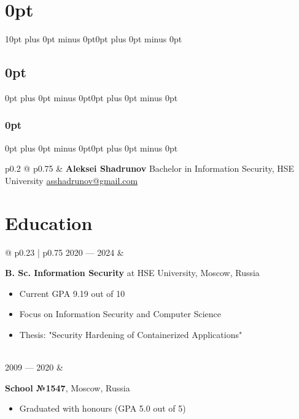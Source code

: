 \documentclass[12pt, a4paper]{extarticle}
\begin{document}
\titlespacing\section{0pt}{10pt plus 0pt minus 0pt}{0pt plus 0pt minus 0pt}
\titlespacing\subsection{0pt}{0pt plus 0pt minus 0pt}{0pt plus 0pt minus 0pt}
\titlespacing\subsubsection{0pt}{0pt plus 0pt minus 0pt}{0pt plus 0pt minus 0pt}

\begin{tabular}{ p{0.2\textwidth} @{\textwidth} p{0.75\textwidth} }
    &
    {\huge \bf \raggedleft Aleksei Shadrunov}  \newline
    \small
    {Bachelor in Information Security, HSE University} \newline
    \href{mailto:asshadrunov@gmail.com}{asshadrunov@gmail.com} \\
\end{tabular}

\section*{Education}

\begin{tabular}{ @{\hskip 0pt} p{0.23\textwidth} | p{0.75\textwidth} }
    2020 — 2024
    & 
    \begin{minipage}[t]{\linewidth}
        {\bf B. Sc. Information Security} at HSE University, Moscow, Russia 
        \begin{itemize}[nosep,after=\strut]
            \item Current GPA 9.19 out of 10
            \item Focus on Information Security and Computer Science
            \item Thesis: "Security Hardening of Containerized Applications"
        \end{itemize}
    \end{minipage} \\
    2009 — 2020 
    & 
    \begin{minipage}[t]{\linewidth}
        {\bf School №1547}, Moscow, Russia 
        \begin{itemize}[nosep,after=\strut]
            \item Graduated with honours (GPA 5.0 out of 5)
        \end{itemize}
    \end{minipage} \\
\end{tabular}
\end{document}
